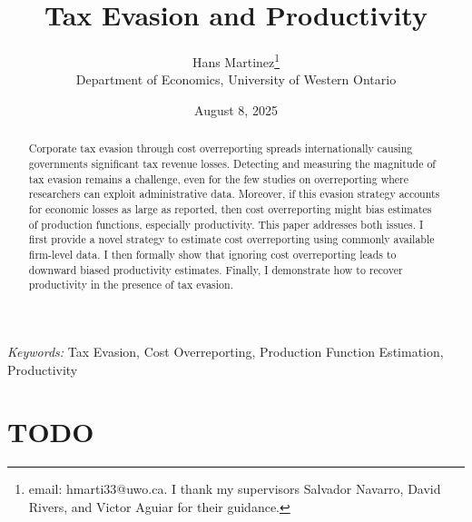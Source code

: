 \documentclass[
  12pt]{article}
\theoremstyle{definition}
\theoremstyle{remark}
\begin{document}
\def\spacingset#1{\renewcommand{\baselinestretch}%
{#1}\small\normalsize} \spacingset{1}



\date{August 8, 2025}
\title{\bf Tax Evasion and Productivity}
\author{
Hans Martinez\thanks{email: hmarti33@uwo.ca. I thank my supervisors
Salvador Navarro, David Rivers, and Victor Aguiar for their guidance.}\\
Department of Economics, University of Western Ontario\\
}
\maketitle

\bigskip
\bigskip
\begin{abstract}
Corporate tax evasion through cost overreporting spreads internationally
causing governments significant tax revenue losses. Detecting and
measuring the magnitude of tax evasion remains a challenge, even for the
few studies on overreporting where researchers can exploit
administrative data. Moreover, if this evasion strategy accounts for
economic losses as large as reported, then cost overreporting might bias
estimates of production functions, especially productivity. This paper
addresses both issues. I first provide a novel strategy to estimate cost
overreporting using commonly available firm-level data. I then formally
show that ignoring cost overreporting leads to downward biased
productivity estimates. Finally, I demonstrate how to recover
productivity in the presence of tax evasion.
\end{abstract}

\noindent%
{\it Keywords:} Tax Evasion, Cost Overreporting, Production Function
Estimation, Productivity
\vfill

\newpage
\spacingset{1.9} %

\section*{TODO}\label{todo}
\end{document}
